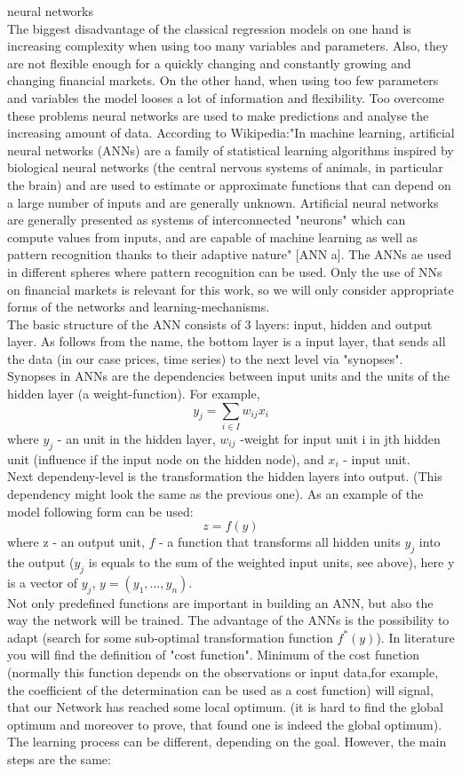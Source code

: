 \documentclass {article}
\begin{document}
neural networks\\
The biggest disadvantage of the classical regression models on one hand  is increasing complexity when using too many variables and parameters. Also, they are not flexible enough for a quickly changing and constantly growing and changing financial markets. On the other hand, when using too few parameters and variables the model looses a lot of information and flexibility. Too overcome these problems neural networks are used to make predictions and analyse the increasing amount of data. According to Wikipedia:"In machine learning, artificial neural networks (ANNs) are a family of statistical learning algorithms inspired by biological neural networks (the central nervous systems of animals, in particular the brain) and are used to estimate or approximate functions that can depend on a large number of inputs and are generally unknown. Artificial neural networks are generally presented as systems of interconnected "neurons" which can compute values from inputs, and are capable of machine learning as well as pattern recognition thanks to their adaptive nature" [ANN a]. The ANNs ae used in different spheres where pattern recognition can be used. Only the use of NNs on financial markets is relevant for this work, so we will only consider appropriate forms of the networks and learning-mechanisms.\\
The basic structure of the ANN consists of 3 layers: input, hidden and output layer. As follows from the name, the bottom layer is a input layer, that sends all the data (in our case prices, time series) to the next level via "synopses". Synopses in ANNs are the dependencies between input units and the units of the hidden layer (a weight-function). For example,
\[y_{j} = \sum_{i \in I}w_{ij}x_{i} \]
where $y_{j}$ - an unit in the hidden layer, $w_{ij}$ -weight for input unit i in jth hidden unit (influence if the input node on the hidden node), and $x_{i}$ - input unit.\\
Next dependeny-level is the transformation the hidden layers into output. (This dependency might look the same as the previous one). As an example of the model following form can be used:
\[z=f(y)\]
where z - an output unit, $f$ - a function that transforms all hidden units $y_{j}$ into the output ($y_{j}$ is equals to the sum of the weighted input units, see above), here y is a vector of $y_{j}$, $y=(y_{1},...,y_{n})$.\\
Not only predefined functions are important in building an ANN, but also the way the network will be trained. The advantage of the ANNs is the possibility to adapt (search for some sub-optimal transformation function $f^*(y)$). In literature you will find the definition of "cost function". Minimum of the cost function (normally this function depends on the observations or input data,for example, the coefficient of the determination can be used as a cost function) will signal, that our Network has reached some local optimum. (it is hard to find the global optimum and moreover to prove, that found one is indeed the global optimum). The learning process can be different, depending on the goal. However, the main steps are the same:\\
\end{document}
